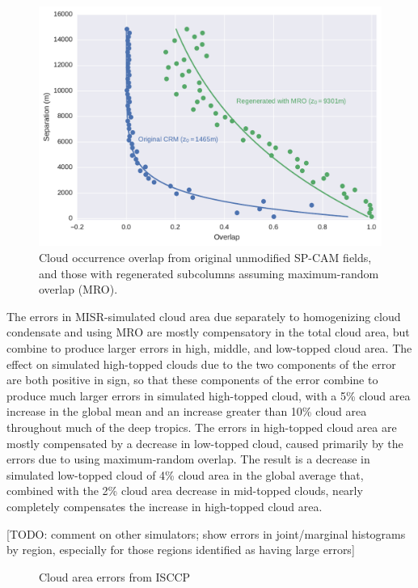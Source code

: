 \begin{figure} 
\centering 
\includegraphics[width=\linewidth]{graphics/overlap_mro.pdf} 
\caption{Cloud occurrence overlap from original unmodified SP-CAM fields, and those with regenerated subcolumns assuming maximum-random overlap (MRO).} 
\label{sg_overlap_mro}
\end{figure}

The errors in MISR-simulated cloud area due separately to homogenizing cloud condensate and using MRO are mostly compensatory in the total cloud area, but combine to produce larger errors in high, middle, and low-topped cloud area. The effect on simulated high-topped clouds due to the two components of the error are both positive in sign, so that these components of the error combine to produce much larger errors in simulated high-topped cloud, with a 5\% cloud area increase in the global mean and an increase greater than 10\% cloud area throughout much of the deep tropics. The errors in high-topped cloud area are mostly compensated by a decrease in low-topped cloud, caused primarily by the errors due to using maximum-random overlap. The result is a decrease in simulated low-topped cloud of 4\% cloud area in the global average that, combined with the 2\% cloud area decrease in mid-topped clouds, nearly completely compensates the increase in high-topped cloud area. 

[TODO: comment on other simulators; show errors in joint/marginal histograms by region, especially for those regions identified as having large errors]
\begin{figure}
\centering
\caption{Cloud area errors from ISCCP}
\label{sg_cldisccp_errors}
\end{figure}

